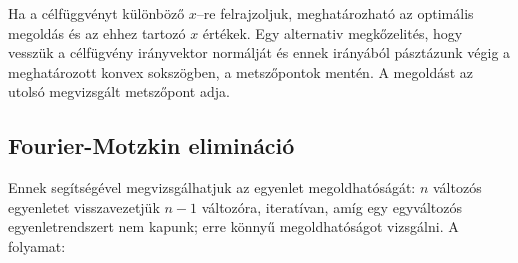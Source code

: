 Ha a célfüggvényt különböző $x$--re felrajzoljuk, meghatározható az optimális
megoldás és az ehhez tartozó $x$ értékek. Egy alternativ megkőzelités, hogy
vesszük a célfügvény irányvektor normálját és ennek irányából pásztázunk végig a
meghatározott konvex sokszögben, a metszőpontok mentén. A megoldást az utolsó
megvizsgált metszőpont adja.

\subsection{Fourier-Motzkin elimináció}

Ennek segítségével megvizsgálhatjuk az egyenlet megoldhatóságát: $n$ változós
egyenletet visszavezetjük $n-1$ változóra, iteratívan, amíg egy egyváltozós
egyenletrendszert nem kapunk; erre könnyű megoldhatóságot vizsgálni. A folyamat:

